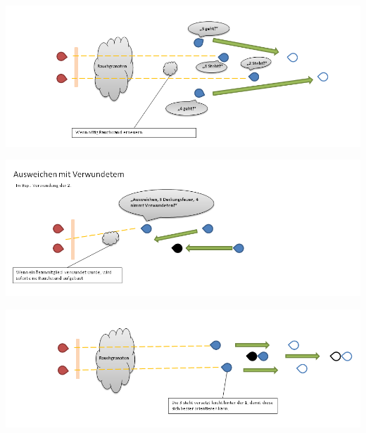 \begin{minipage}[t]{1\textwidth}
\includegraphics[width=\textwidth]{./Grafiken/Abschnitt/Ausweichen_aus_Kolonne_3.png}
\end{minipage}

\begin{minipage}[t]{1\textwidth}
\includegraphics[width=\textwidth]{./Grafiken/Abschnitt/Ausweichen_aus_Kolonne_verletzt.png}
\end{minipage}

\begin{minipage}[t]{1\textwidth}
\includegraphics[width=\textwidth]{./Grafiken/Abschnitt/Ausweichen_aus_Kolonne_verletzt_2.png}
\end{minipage}

